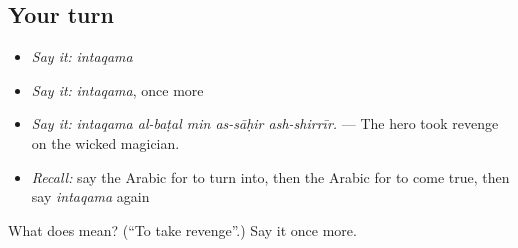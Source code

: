 \subsection*{Your turn}
\begin{itemize}
\raggedright
  \item \emph{Say it:} \emph{intaqama}
  \item \emph{Say it:} \emph{intaqama}, once more
  \item \emph{Say it:} \emph{intaqama al-baṭal min as-sāḥir ash-shirrīr.} — The hero took revenge on the wicked magician.
  \item \emph{Recall:} say the Arabic for to turn into, then the Arabic for to come true, then say \emph{intaqama} again
\end{itemize}

\begin{tcolorbox}[breakable,colback=teal!4,colframe=teal!35!black,title={Before you move on}]
What does  mean? (\textquotedblleft{}To take revenge\textquotedblright{}.) Say it once more.
\end{tcolorbox}

